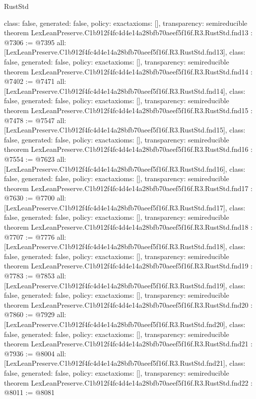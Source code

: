 \begin{lexlean}{RustStd}
\begin{coremodule}
{  class: false,
  generated: false,
  policy: exact{axioms: []},
  transparency: semireducible
}
theorem LexLeanPreserve.C1b912f4fc4d4e14a28bfb70aeef5f16f.R3.RustStd.fnd13 : @7306 := @7395 {
  all: [LexLeanPreserve.C1b912f4fc4d4e14a28bfb70aeef5f16f.R3.RustStd.fnd13],
  class: false,
  generated: false,
  policy: exact{axioms: []},
  transparency: semireducible
}
theorem LexLeanPreserve.C1b912f4fc4d4e14a28bfb70aeef5f16f.R3.RustStd.fnd14 : @7402 := @7471 {
  all: [LexLeanPreserve.C1b912f4fc4d4e14a28bfb70aeef5f16f.R3.RustStd.fnd14],
  class: false,
  generated: false,
  policy: exact{axioms: []},
  transparency: semireducible
}
theorem LexLeanPreserve.C1b912f4fc4d4e14a28bfb70aeef5f16f.R3.RustStd.fnd15 : @7478 := @7547 {
  all: [LexLeanPreserve.C1b912f4fc4d4e14a28bfb70aeef5f16f.R3.RustStd.fnd15],
  class: false,
  generated: false,
  policy: exact{axioms: []},
  transparency: semireducible
}
theorem LexLeanPreserve.C1b912f4fc4d4e14a28bfb70aeef5f16f.R3.RustStd.fnd16 : @7554 := @7623 {
  all: [LexLeanPreserve.C1b912f4fc4d4e14a28bfb70aeef5f16f.R3.RustStd.fnd16],
  class: false,
  generated: false,
  policy: exact{axioms: []},
  transparency: semireducible
}
theorem LexLeanPreserve.C1b912f4fc4d4e14a28bfb70aeef5f16f.R3.RustStd.fnd17 : @7630 := @7700 {
  all: [LexLeanPreserve.C1b912f4fc4d4e14a28bfb70aeef5f16f.R3.RustStd.fnd17],
  class: false,
  generated: false,
  policy: exact{axioms: []},
  transparency: semireducible
}
theorem LexLeanPreserve.C1b912f4fc4d4e14a28bfb70aeef5f16f.R3.RustStd.fnd18 : @7707 := @7776 {
  all: [LexLeanPreserve.C1b912f4fc4d4e14a28bfb70aeef5f16f.R3.RustStd.fnd18],
  class: false,
  generated: false,
  policy: exact{axioms: []},
  transparency: semireducible
}
theorem LexLeanPreserve.C1b912f4fc4d4e14a28bfb70aeef5f16f.R3.RustStd.fnd19 : @7783 := @7853 {
  all: [LexLeanPreserve.C1b912f4fc4d4e14a28bfb70aeef5f16f.R3.RustStd.fnd19],
  class: false,
  generated: false,
  policy: exact{axioms: []},
  transparency: semireducible
}
theorem LexLeanPreserve.C1b912f4fc4d4e14a28bfb70aeef5f16f.R3.RustStd.fnd20 : @7860 := @7929 {
  all: [LexLeanPreserve.C1b912f4fc4d4e14a28bfb70aeef5f16f.R3.RustStd.fnd20],
  class: false,
  generated: false,
  policy: exact{axioms: []},
  transparency: semireducible
}
theorem LexLeanPreserve.C1b912f4fc4d4e14a28bfb70aeef5f16f.R3.RustStd.fnd21 : @7936 := @8004 {
  all: [LexLeanPreserve.C1b912f4fc4d4e14a28bfb70aeef5f16f.R3.RustStd.fnd21],
  class: false,
  generated: false,
  policy: exact{axioms: []},
  transparency: semireducible
}
theorem LexLeanPreserve.C1b912f4fc4d4e14a28bfb70aeef5f16f.R3.RustStd.fnd22 : @8011 := @8081 {
}
\end{coremodule}
\end{lexlean}
